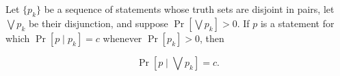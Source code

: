 Let $\{p_k\}$ be a sequence of statements whose truth sets are disjoint in pairs, let $\bigvee p_k$ be their disjunction, and suppose $\Pr[\bigvee p_k] > 0$. If $p$ is a statement for which $\Pr[p \mid p_k] = c$ whenever $\Pr[p_k] > 0$, then

$$\Pr[p \mid \bigvee p_k] = c.$$
